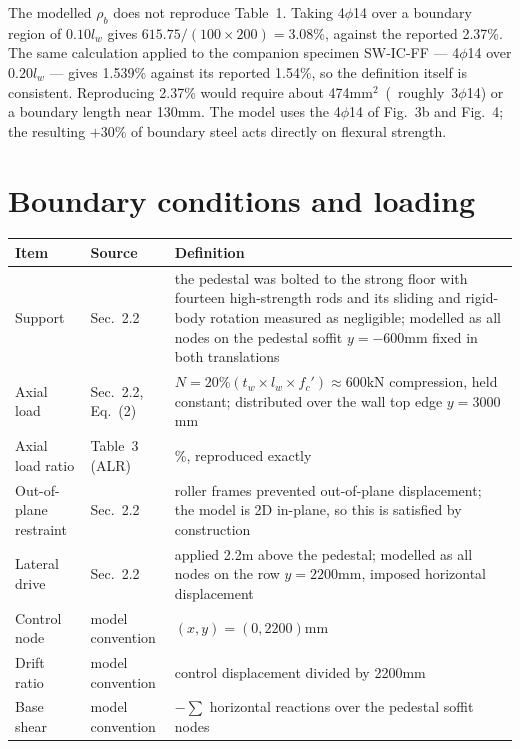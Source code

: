 \documentclass[11pt,a4paper]{article}
\begin{document}
The modelled $\rho_b$ does not reproduce Table~1. Taking 4$\phi$14 over a boundary region of
$0.10 l_w$ gives $615.75 / (100 \times 200) = 3.08\%$, against the reported 2.37\%. The same
calculation applied to the companion specimen SW-IC-FF --- 4$\phi$14 over $0.20 l_w$ --- gives
1.539\% against its reported 1.54\%, so the definition itself is consistent. Reproducing 2.37\%
would require about 474\unit{mm$^2$} (roughly 3$\phi$14) or a boundary length near 130\unit{mm}.
The model uses the 4$\phi$14 of Fig.~3b and Fig.~4; the resulting $+30\%$ of boundary steel acts
directly on flexural strength.

\section{Boundary conditions and loading}

\begin{tabularx}{\textwidth}{@{}p{36mm}p{28mm}>{\raggedright\arraybackslash}X@{}}
\toprule
\textbf{Item} & \textbf{Source} & \textbf{Definition} \\
\midrule
Support        & Sec.~2.2 & the pedestal was bolted to the strong floor with fourteen high-strength
rods and its sliding and rigid-body rotation measured as negligible; modelled as all nodes on the
pedestal soffit $y = -600$\unit{mm} fixed in both translations \\
Axial load     & Sec.~2.2, Eq.~(2) & $N = 20\%(t_w \times l_w \times f_c') \approx 600$\unit{kN}
compression, held constant; distributed over the wall top edge $y = 3000$\unit{mm} \\
Axial load ratio & Table~3 (ALR) & 20\%, reproduced exactly \\
Out-of-plane restraint & Sec.~2.2 & roller frames prevented out-of-plane displacement; the model is
2D in-plane, so this is satisfied by construction \\
Lateral drive  & Sec.~2.2 & applied 2.2\unit{m} above the pedestal; modelled as all nodes on the row
$y = 2200$\unit{mm}, imposed horizontal displacement \\
Control node   & model convention & $(x,y) = (0, 2200)$\unit{mm} \\
Drift ratio    & model convention & control displacement divided by 2200\unit{mm} \\
Base shear     & model convention & $-\sum$ horizontal reactions over the pedestal soffit nodes \\
\bottomrule
\end{tabularx}
\end{document}
